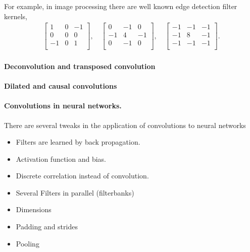 \documentclass[12pt,a4paper]{article}
\begin{document}
For example, in image processing  there are well known edge detection filter kernels, 
\begin{align}
	\left[
	\begin{array}{rrr}
	1 & 0 & -1 \\ 
	0 & 0 & 0 \\
	-1 & 0 & 1 \\ 
	\end{array}\right],
	\quad
	\left[
	\begin{array}{rrr}
	0 & -1 & 0 \\ 
	-1 & 4 & -1 \\
	0 & -1 & 0 \\ 
	\end{array}\right],	
		\quad
	 \left[
	\begin{array}{rrr}
	-1 & -1 & -1 \\ 
	-1 & 8 & -1 \\
	-1 & -1 & -1 \\ 
	\end{array}\right].	
\end{align}

\paragraph{Deconvolution and transposed convolution}\cite{zeiler_deconvolution_nn_2010}
\paragraph{Dilated and causal convolutions}\cite{yu2016multiscale, chen2016semantic}

\paragraph{Convolutions in neural networks.} There are several tweaks in the application of convolutions to neural networks
\begin{itemize}
	\item Filters are learned by back propagation.
	\item Activation function and bias.
	\item Discrete correlation instead of convolution.
	\item Several Filters in parallel (filterbanks)
	\item Dimensions
	\item Padding and strides
	\item Pooling
\end{itemize}
\end{document}
